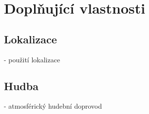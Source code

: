 
\section{Doplňující vlastnosti}



\subsection{Lokalizace}

- použití lokalizace 

\subsection{Hudba}

- atmosférický hudební doprovod
